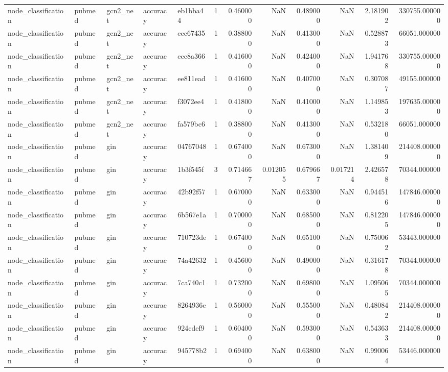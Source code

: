 \begin{tabular}{lllllrrrrrrr}
node_classification & pubmed & gcn2_net & accuracy & eb1bba44 & 1 & 0.460000 & NaN & 0.489000 & NaN & 2.181902 & 330755.000000 \\
node_classification & pubmed & gcn2_net & accuracy & ecc67435 & 1 & 0.388000 & NaN & 0.413000 & NaN & 0.528873 & 66051.000000 \\
node_classification & pubmed & gcn2_net & accuracy & ecc8a366 & 1 & 0.416000 & NaN & 0.424000 & NaN & 1.941768 & 330755.000000 \\
node_classification & pubmed & gcn2_net & accuracy & ee811ead & 1 & 0.416000 & NaN & 0.407000 & NaN & 0.307087 & 49155.000000 \\
node_classification & pubmed & gcn2_net & accuracy & f3072ee4 & 1 & 0.418000 & NaN & 0.410000 & NaN & 1.149853 & 197635.000000 \\
node_classification & pubmed & gcn2_net & accuracy & fa579bc6 & 1 & 0.388000 & NaN & 0.413000 & NaN & 0.532180 & 66051.000000 \\
node_classification & pubmed & gin & accuracy & 04767048 & 1 & 0.674000 & NaN & 0.673000 & NaN & 1.381409 & 214408.000000 \\
node_classification & pubmed & gin & accuracy & 1b3f545f & 3 & 0.714667 & 0.012055 & 0.679667 & 0.017214 & 2.426578 & 70344.000000 \\
node_classification & pubmed & gin & accuracy & 42b92f57 & 1 & 0.670000 & NaN & 0.633000 & NaN & 0.944516 & 147846.000000 \\
node_classification & pubmed & gin & accuracy & 6b567e1a & 1 & 0.700000 & NaN & 0.685000 & NaN & 0.812205 & 147846.000000 \\
node_classification & pubmed & gin & accuracy & 710723de & 1 & 0.674000 & NaN & 0.651000 & NaN & 0.750062 & 53443.000000 \\
node_classification & pubmed & gin & accuracy & 74a42632 & 1 & 0.456000 & NaN & 0.490000 & NaN & 0.316178 & 70344.000000 \\
node_classification & pubmed & gin & accuracy & 7ca740c1 & 1 & 0.732000 & NaN & 0.698000 & NaN & 1.095065 & 70344.000000 \\
node_classification & pubmed & gin & accuracy & 8264936c & 1 & 0.560000 & NaN & 0.555000 & NaN & 0.480842 & 214408.000000 \\
node_classification & pubmed & gin & accuracy & 924cdef9 & 1 & 0.604000 & NaN & 0.593000 & NaN & 0.543633 & 214408.000000 \\
node_classification & pubmed & gin & accuracy & 945778b2 & 1 & 0.694000 & NaN & 0.638000 & NaN & 0.990064 & 53446.000000 \\

\end{tabular}
